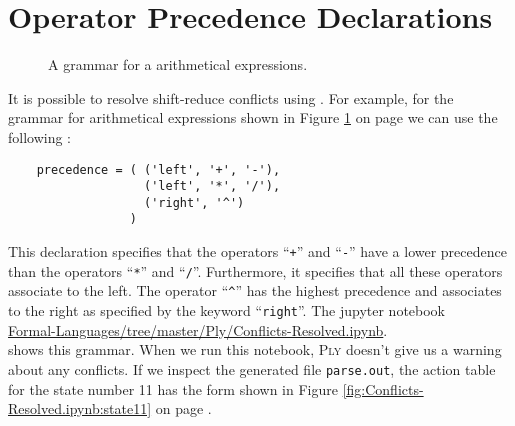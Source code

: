\section{Operator Precedence Declarations \label{section:operator-precedence}}
\begin{figure}[!ht]

  \begin{center}    
  \end{center}
  \caption{A grammar for a arithmetical expressions.}
  \label{fig:grammar-resolved.g}
\end{figure}
It is possible to resolve shift-reduce conflicts using .
For example, for the grammar for arithmetical expressions shown in Figure \ref{fig:grammar-resolved.g}
on page \pageref{fig:grammar-resolved.g} we can use the following :
\begin{verbatim}
    precedence = ( ('left', '+', '-'),
                   ('left', '*', '/'),
                   ('right', '^')
                 )
\end{verbatim}
This declaration specifies that the operators ``\texttt{+}'' and ``\texttt{-}'' have a lower precedence than
the operators  ``\texttt{*}'' and ``\texttt{/}''.  Furthermore, it specifies that all these operators associate
to the left.  The operator ``\texttt{\^}'' has the highest precedence and associates to the right as specified
by the keyword ``\texttt{right}''.
The jupyter notebook
\\[0.2cm]
\hspace*{1.3cm}
\href{https://github.com/karlstroetmann/Formal-Languages/tree/master/Ply/Conflicts-Resolved.ipynb}{Formal-Languages/tree/master/Ply/Conflicts-Resolved.ipynb}.
\\[0.2cm]
shows this grammar.  When we run this notebook, \textsc{Ply} doesn't give us a
warning about any conflicts.  If we inspect the generated file \texttt{parse.out}, the action table for the
state number 11 has the form shown in Figure \ref{fig:Conflicts-Resolved.ipynb:state11} on page
\pageref{fig:Conflicts-Resolved.ipynb:state11}.

